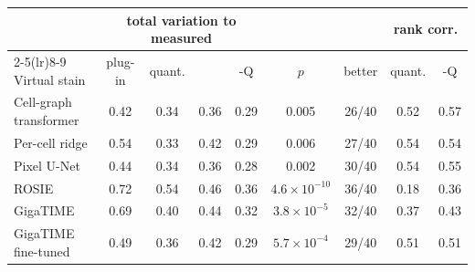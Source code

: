 \begin{tabular}{@{}lcccccccc@{}}
\toprule
 & \multicolumn{4}{c}{total variation to measured} & & & \multicolumn{2}{c}{rank corr.} \\
\cmidrule(lr){2-5}\cmidrule(lr){8-9}
Virtual stain & plug-in & quant. & \method{} & \method{}-Q & $p$ & better & quant. & \method{}-Q \\
\midrule
Cell-graph transformer & 0.42 & 0.34 & 0.36 & 0.29 & 0.005 & 26/40 & 0.52 & 0.57 \\
Per-cell ridge & 0.54 & 0.33 & 0.42 & 0.29 & 0.006 & 27/40 & 0.54 & 0.54 \\
Pixel U-Net & 0.44 & 0.34 & 0.36 & 0.28 & 0.002 & 30/40 & 0.54 & 0.55 \\
ROSIE & 0.72 & 0.54 & 0.46 & 0.36 & $4.6{\times}10^{-10}$ & 36/40 & 0.18 & 0.36 \\
GigaTIME & 0.69 & 0.40 & 0.44 & 0.32 & $3.8{\times}10^{-5}$ & 32/40 & 0.37 & 0.43 \\
GigaTIME fine-tuned & 0.49 & 0.36 & 0.42 & 0.29 & $5.7{\times}10^{-4}$ & 29/40 & 0.51 & 0.51 \\
\bottomrule
\end{tabular}
